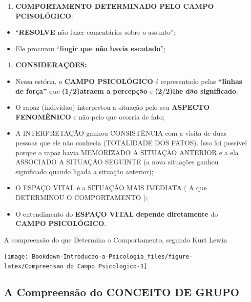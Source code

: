 \documentclass[
]{book}
\providecommand{\tightlist}{%
  \setlength{\itemsep}{0pt}\setlength{\parskip}{0pt}}
\begin{document}
\begin{enumerate}
\def\labelenumi{\arabic{enumi}.}
\setcounter{enumi}{1}
\tightlist
\item
  \textbf{COMPORTAMENTO DETERMINADO PELO CAMPO PCISOLÓGICO}:
\end{enumerate}

\begin{itemize}
\tightlist
\item
  ``\textbf{RESOLVE} não fazer comentários sobre o assunto'';
\item
  Ele procurou ``\textbf{fingir que não havia escutado}'';
\end{itemize}

\begin{enumerate}
\def\labelenumi{\arabic{enumi}.}
\setcounter{enumi}{2}
\tightlist
\item
  \textbf{CONSIDERAÇÕES:}
\end{enumerate}

\begin{itemize}
\tightlist
\item
  Nessa estória, o \textbf{CAMPO PSICOLÓGICO} é representado pelas \textbf{``linhas de força''} que \textbf{(1/2)atraem a percepção} e \textbf{(2/2)lhe dão significado};
\item
  O rapaz (indivíduo) interpretou a situação pelo seu \textbf{ASPECTO FENOMÊNICO} e não pelo que ocorria de fato;
\item
  A INTERPRETAÇÃO ganhou CONSISTÊNCIA com a visita de duas pessoas que ele não conhecia (TOTALIDADE DOS FATOS). Isso foi possível porque o rapaz havia MEMORIZADO A SITUAÇÃO ANTERIOR e a ela ASSOCIADO A SITUAÇÃO SEGUINTE (a nova situações ganhou significado quando ligada a situação anterior);
\item
  O ESPAÇO VITAL é a SITUAÇÃO MAIS IMEDIATA ( A que DETERMINOU O COMPORTAMENTO );
\item
  O entendimento do \textbf{ESPAÇO VITAL} \textbf{depende diretamente} do \textbf{CAMPO PSICOLÓGICO}.
\end{itemize}

A compreensão do que Determina o Comportamento, segundo Kurt Lewin

\texttt{[image: Bookdown-Introducao-a-Psicologia\_files/figure-latex/Compreensao do Campo Psicologico-1]}

\hypertarget{a-compreensuxe3o-do-conceito-de-grupo-1}{%
\subsection{A Compreensão do CONCEITO DE GRUPO}\label{a-compreensuxe3o-do-conceito-de-grupo-1}}
\end{document}
